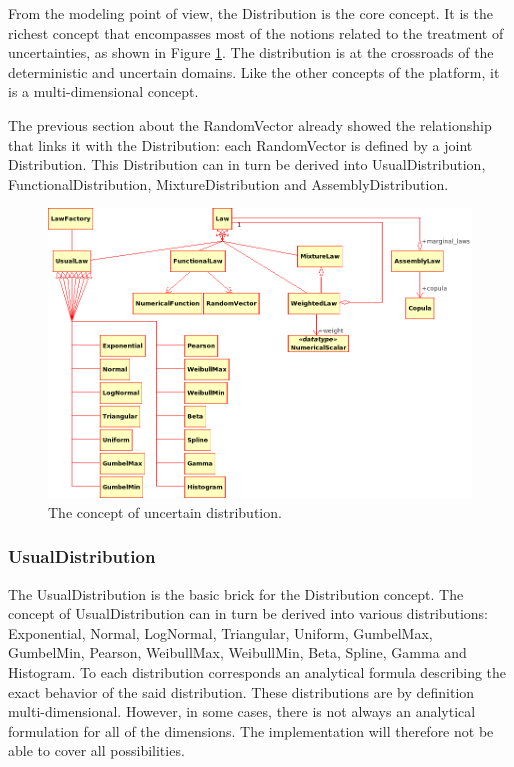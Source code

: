 From the modeling point of view, the Distribution is the core concept. It is the richest concept that encompasses most of the notions related to the treatment of uncertainties, as shown in Figure \ref{fig:distribution}. The distribution is at the crossroads of the deterministic and uncertain domains. Like the other concepts of the platform, it is a multi-dimensional concept.

The previous section about the RandomVector already showed the relationship that links it with the Distribution: each RandomVector is defined by a joint Distribution. This Distribution can in turn be derived into UsualDistribution, FunctionalDistribution, MixtureDistribution and AssemblyDistribution.

\begin{figure}[htb]
  \begin{center}
    \includegraphics[scale=0.5]{Figures/analysis/distribution.png}
    \caption{The concept of uncertain distribution.}\label{fig:distribution}
  \end{center}
\end{figure}

\subsubsection{UsualDistribution}

The UsualDistribution is the basic brick for the Distribution concept. The concept of UsualDistribution can in turn be derived into various distributions: Exponential, Normal, LogNormal, Triangular, Uniform, GumbelMax, GumbelMin, Pearson, WeibullMax, WeibullMin, Beta, Spline, Gamma and Histogram. To each distribution corresponds an analytical formula describing the exact behavior of the said distribution. These distributions are by definition multi-dimensional. However, in some cases, there is not always an analytical formulation for all of the dimensions. The implementation will therefore not be able to cover all possibilities.

